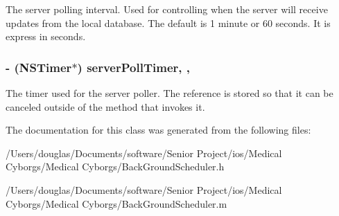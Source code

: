 The server polling interval. Used for controlling when the server will receive updates from the local database. The default is 1 minute or 60 seconds. It is express in seconds. \hypertarget{interface_background_scheduler_ab78e335cbdbd2c276c299380a982f0e4}{
\subsubsection[{server\-Poll\-Timer}]{\setlength{\rightskip}{0pt plus 5cm}-\/ (N\-S\-Timer$\ast$) server\-Poll\-Timer\hspace{0.3cm}{\ttfamily [read]}, {\ttfamily [write]}, {\ttfamily [atomic]}}}\label{interface_background_scheduler_ab78e335cbdbd2c276c299380a982f0e4}
The timer used for the server poller. The reference is stored so that it can be canceled outside of the method that invokes it. 

The documentation for this class was generated from the following files\-:\begin{DoxyCompactItemize}
\item 
/\-Users/douglas/\-Documents/software/\-Senior Project/ios/\-Medical Cyborgs/\-Medical Cyborgs/Back\-Ground\-Scheduler.\-h\item 
/\-Users/douglas/\-Documents/software/\-Senior Project/ios/\-Medical Cyborgs/\-Medical Cyborgs/Back\-Ground\-Scheduler.\-m\end{DoxyCompactItemize}
